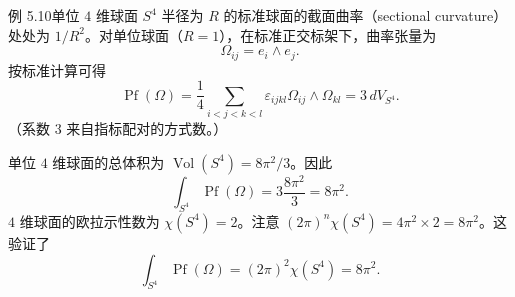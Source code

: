 \begin{statement}{例 5.10}{单位 $4$ 维球面 $S^4$}
半径为 $R$ 的标准球面的截面曲率（sectional curvature）处处为 $1/R^2$。对单位球面（$R=1$），在标准正交标架下，曲率张量为
\[
  \Omega_{ij}=e_i\wedge e_j.
\]
按标准计算可得
\[
  \operatorname{Pf}(\Omega)=\frac14
     \sum_{i<j<k<l}\varepsilon_{ijkl}\Omega_{ij}\wedge\Omega_{kl}
     =3\,dV_{S^4}.
\]
（系数 $3$ 来自指标配对的方式数。）

单位 $4$ 维球面的总体积为 $\operatorname{Vol}(S^4)=8\pi^2/3$。因此
\[
  \int_{S^4}\operatorname{Pf}(\Omega)=3\frac{8\pi^2}{3}=8\pi^2.
\]
$4$ 维球面的欧拉示性数为 $\chi(S^4)=2$。注意 $(2\pi)^n\chi(S^4)=4\pi^2\times2=8\pi^2$。这验证了
\[
  \int_{S^4}\operatorname{Pf}(\Omega)=(2\pi)^2\chi(S^4)=8\pi^2.
\]
\end{statement}
